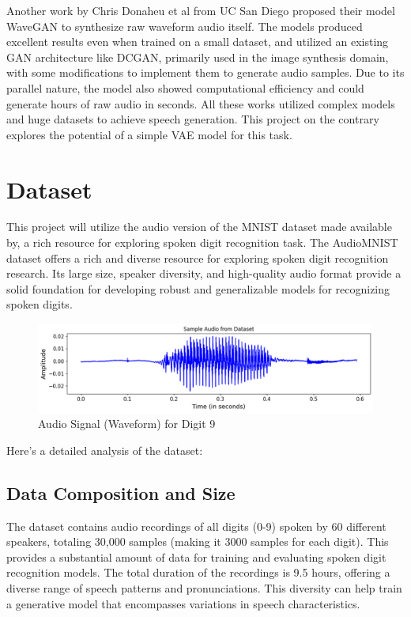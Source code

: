 \documentclass[12pt]{article}
\begin{document}
Another work by Chris Donaheu et al from UC San Diego \cite{Donahue2018Adversarial} proposed their model WaveGAN to synthesize raw waveform audio itself. The models produced excellent results even when trained on a small dataset, and utilized an existing GAN architecture like DCGAN, primarily used in the image synthesis domain, with some modifications to implement them to generate audio samples. Due to its parallel nature, the model also showed computational efficiency and could generate hours of raw audio in seconds. All these works utilized complex models and huge datasets to achieve speech generation. This project on the contrary explores the potential of a simple VAE model for this task.

\section{Dataset}
This project will utilize the audio version of the MNIST dataset made available by, a rich resource for exploring spoken digit recognition task. The AudioMNIST dataset offers a rich and diverse resource for exploring spoken digit recognition research. Its large size, speaker diversity, and high-quality audio format provide a solid foundation for developing robust and generalizable models for recognizing spoken digits.

\begin{figure}[!h]
    \centering
    \includegraphics[width=0.75\linewidth]{figures/sample audio.png}
    \caption{Audio Signal (Waveform) for Digit 9}
    \label{fig:enter-label}
\end{figure}

Here's a detailed analysis of the dataset:

\subsection{Data Composition and Size}
The dataset contains audio recordings of all digits (0-9) spoken by 60 different speakers, totaling 30,000 samples (making it 3000 samples for each digit). This provides a substantial amount of data for training and evaluating spoken digit recognition models. The total duration of the recordings is 9.5 hours, offering a diverse range of speech patterns and pronunciations. This diversity can help train a generative model that encompasses variations in speech characteristics.
\end{document}
